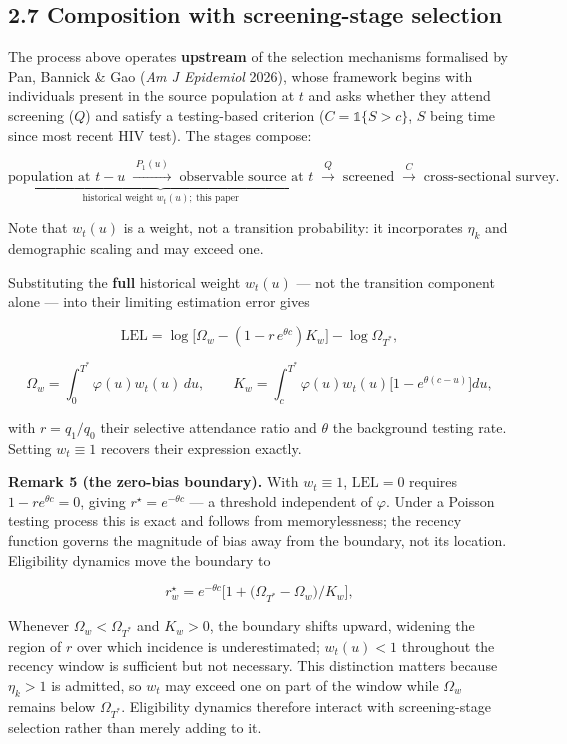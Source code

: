 \subsection{2.7 Composition with screening-stage selection}

The process above operates \textbf{upstream} of the selection mechanisms formalised by Pan, Bannick \& Gao (\emph{Am J Epidemiol} 2026), whose framework begins with individuals present in the source population at \(t\) and asks whether they attend screening (\(Q\)) and satisfy a testing-based criterion (\(C=\mathbb{1}\{S>c\}\), \(S\) being time since most recent HIV test). The stages compose:

\[
\underbrace{\text{population at }t-u \;\xrightarrow{\;P_1(u)\;}\; \text{observable source at }t}_{\text{historical weight } w_t(u);\ \text{this paper}}
\;\xrightarrow{\;Q\;}\;\text{screened}\;\xrightarrow{\;C\;}\;\text{cross-sectional survey}.
\]

Note that \(w_t(u)\) is a weight, not a transition probability: it incorporates \(\eta_k\) and demographic scaling and may exceed one.

Substituting the \textbf{full} historical weight \(w_t(u)\) --- not the transition component alone --- into their limiting estimation error gives

\[
\mathrm{LEL} = \log\!\big[\Omega_w - (1-r\,e^{\theta c})K_w\big] - \log\Omega_{T^*},
\]

\[
\Omega_w=\int_0^{T^*}\!\varphi(u)w_t(u)\,du,
\qquad
K_w=\int_c^{T^*}\!\varphi(u)w_t(u)\big[1-e^{\theta(c-u)}\big]du,
\]

with \(r=q_1/q_0\) their selective attendance ratio and \(\theta\) the background testing rate. Setting \(w_t\equiv1\) recovers their expression exactly.

\textbf{Remark 5 (the zero-bias boundary).} With \(w_t\equiv1\), \(\mathrm{LEL}=0\) requires \(1-re^{\theta c}=0\), giving \(r^\star=e^{-\theta c}\) --- a threshold independent of \(\varphi\). Under a Poisson testing process this is exact and follows from memorylessness; the recency function governs the magnitude of bias away from the boundary, not its location. Eligibility dynamics move the boundary to

\[
r^\star_w = e^{-\theta c}\Big[1+\big(\Omega_{T^*}-\Omega_w\big)/K_w\Big],
\]

Whenever \(\Omega_w<\Omega_{T^*}\) and \(K_w>0\), the boundary shifts upward, widening the region of \(r\) over which incidence is underestimated; \(w_t(u)<1\) throughout the recency window is sufficient but not necessary. This distinction matters because \(\eta_k>1\) is admitted, so \(w_t\) may exceed one on part of the window while \(\Omega_w\) remains below \(\Omega_{T^*}\). Eligibility dynamics therefore interact with screening-stage selection rather than merely adding to it.


